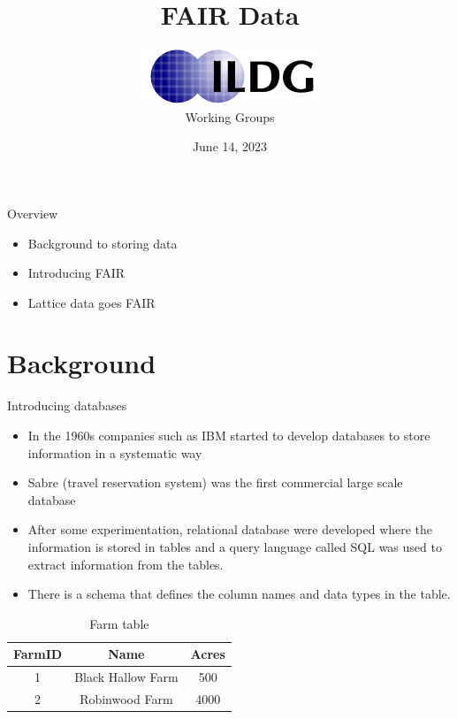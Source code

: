 \documentclass[aspectratio=169,xcolor=dvipsnames]{beamer}
\title[short title]{FAIR Data}
\author{\includegraphics[scale=0.5]{ildg-logo}\\Working Groups}
\institute{Hands-on Workshop}
\date{June 14, 2023 } %
\begin{document}
\begin{frame}
    \titlepage

\end{frame}

\begin{frame}{Overview}

\begin{itemize}
    \item Background to storing data
     \item Introducing FAIR
    \item Lattice data goes FAIR
\end{itemize}
 
\end{frame}

\section{Background}

\begin{frame}{Introducing databases}

\begin{itemize}
    \item In the 1960s companies such as IBM started to develop databases to store 
           information in a systematic way
\item Sabre (travel reservation system) was the first commercial large scale database
    \item After some experimentation,  relational database were developed where the information is stored in tables and a query language called SQL was used to extract information from the tables.

    \item There is a schema that defines the column names and data types in the table. 
\end{itemize}

\begin{table}
\begin{tabular}{ c c c}
  FarmID & Name              & Acres \\  \hline
   1     & Black Hallow Farm & 500  \\
   2     & Robinwood Farm    & 4000 \\
\end{tabular}
\caption{Farm table}
\end{table}


\end{frame}
\end{document}
